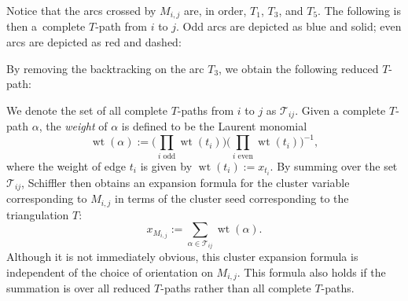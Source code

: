 \documentclass[pdftex]{sigma}
\numberwithin{equation}{section}
\DeclareMathOperator{\wt}{wt}
\begin{document}
\begin{Example}
\begin{center}
\end{center}
Notice that the arcs crossed by $M_{i,j}$ are, in order, $T_1$, $T_3$, and $T_5$. The following is then a~complete $T$-path from $i$ to $j$. Odd arcs are depicted as blue and solid; even arcs are depicted as red and dashed:
\begin{center}
\end{center}
By removing the backtracking on the arc $T_3$, we obtain the following reduced $T$-path:
\begin{center}
\end{center}
\end{Example}

We denote the set of all complete $T$-paths from $i$ to $j$ as $\mathcal{T}_{ij}$. Given a complete $T$-path $\alpha$, the \emph{weight} of $\alpha$ is defined to be the Laurent monomial
\[ \wt(\alpha) := \bigg( \prod_{i \textrm{ odd}} \wt(t_{i}) \bigg)\bigg( \prod_{i \textrm{ even}} \wt(t_i) \bigg)^{-1}, \]
where the weight of edge $t_i$ is given by $\wt(t_i) := x_{t_i}$. By summing over the set $\mathcal{T}_{ij}$, Schiffler \cite{S-10} then obtains an expansion formula for the cluster variable corresponding to $M_{i,j}$ in terms of the cluster seed corresponding to the triangulation $T$:
\[ x_{M_{i,j}} := \sum_{\alpha \in \mathcal{T}_{ij}} \wt(\alpha). \]
Although it is not immediately obvious, this cluster expansion formula is independent of the choice of orientation on $M_{i,j}$. This formula also holds if the summation is over all reduced $T$-paths rather than all complete $T$-paths.
\end{document}
